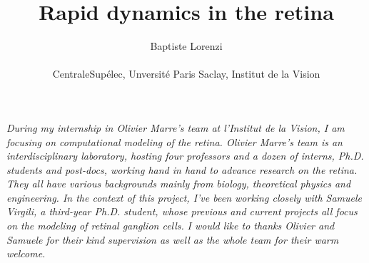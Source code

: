 \documentclass[12pt]{article}
\title{Rapid dynamics in the retina}
\author{Baptiste Lorenzi\\
    \\
    \normalsize{CentraleSupélec, Unversité Paris Saclay, Institut de la
        Vision}\\}
\date{}
\begin{document}

\baselineskip24pt


\maketitle


\textit{During my internship in Olivier Marre's team at l'Institut de la
    Vision, I am
    focusing on computational modeling of the retina. Olivier Marre's team is
    an
    interdisciplinary laboratory, hosting four professors and a dozen of
    interns,
    Ph.D. students and post-docs, working hand in hand to advance research
    on the retina. They all have various backgrounds mainly from biology,
    theoretical physics and engineering. In the context of this project, I've
    been
    working
    closely with Samuele Virgili, a third-year Ph.D. student, whose previous
    and
    current projects all focus on the modeling of retinal ganglion cells.}
\textit{I would like to thanks Olivier and Samuele for their kind supervision
    as well as the whole team for their
    warm welcome.}














% 





\clearpage
\end{document}
